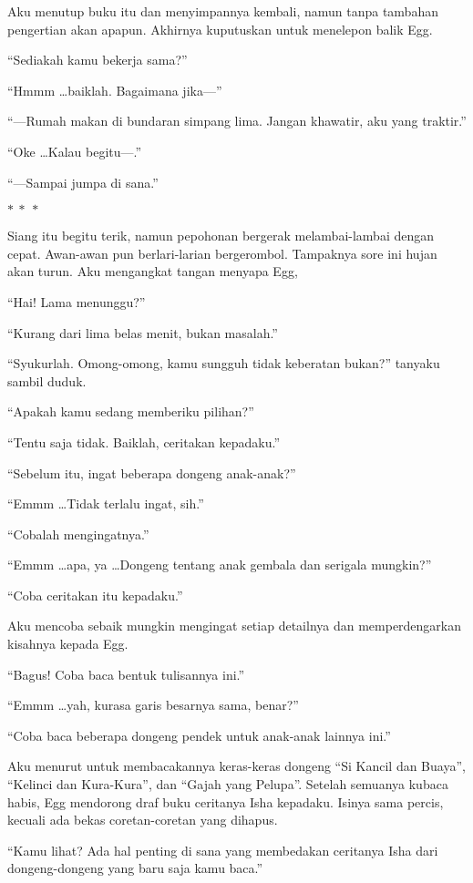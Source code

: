 \documentclass[smalldemyvopaper,11pt,twoside,onecolumn,openright,extrafontsizes]{memoir}
\newcommand\separator{
  \begin{center}
    \(\ast~\ast~\ast\)
  \end{center}
}
\begin{document}
Aku menutup buku itu dan menyimpannya kembali, namun tanpa tambahan pengertian akan apapun. Akhirnya kuputuskan untuk menelepon balik Egg.

``Sediakah kamu bekerja sama?''

``Hmmm \dots baiklah. Bagaimana jika---''

``---Rumah makan di bundaran simpang lima. Jangan khawatir, aku yang traktir.''

``Oke \dots Kalau begitu---.''

``---Sampai jumpa di sana.''

\separator{}

Siang itu begitu terik, namun pepohonan bergerak melambai-lambai dengan cepat. Awan-awan pun berlari-larian bergerombol. Tampaknya sore ini hujan akan turun. Aku mengangkat tangan menyapa Egg,

``Hai! Lama menunggu?''

``Kurang dari lima belas menit, bukan masalah.''

``Syukurlah. Omong-omong, kamu sungguh tidak keberatan bukan?'' tanyaku sambil duduk.

``Apakah kamu sedang memberiku pilihan?''

``Tentu saja tidak. Baiklah, ceritakan kepadaku.''

``Sebelum itu, ingat beberapa dongeng anak-anak?''

``Emmm \dots Tidak terlalu ingat, sih.''

``Cobalah mengingatnya.''

``Emmm \dots apa, ya \dots Dongeng tentang anak gembala dan serigala mungkin?''

``Coba ceritakan itu kepadaku.''

Aku mencoba sebaik mungkin mengingat setiap detailnya dan memperdengarkan kisahnya kepada Egg.

``Bagus! Coba baca bentuk tulisannya ini.''

``Emmm \dots yah, kurasa garis besarnya sama, benar?''

``Coba baca beberapa dongeng pendek untuk anak-anak lainnya ini.''

Aku menurut untuk membacakannya keras-keras dongeng ``Si Kancil dan Buaya'', ``Kelinci dan Kura-Kura'', dan ``Gajah yang Pelupa''. Setelah semuanya kubaca habis, Egg mendorong draf buku ceritanya Isha kepadaku. Isinya sama percis, kecuali ada bekas coretan-coretan yang dihapus.

``Kamu lihat? Ada hal penting di sana yang membedakan ceritanya Isha dari dongeng-dongeng yang baru saja kamu baca.''
\end{document}
